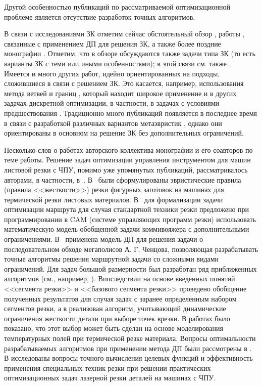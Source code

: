 \documentclass[11pt,twoside,openany]{report}
\begin{document}
Другой особенностью публикаций
по рассматриваемой оптимизационной проблеме
является отсутствие разработок точных алгоритмов.

В связи с исследованиями ЗК отметим сейчас обстоятельный обзор
\cite{intro15,intro16,intro17},
работы \cite{Cha4`,Cha16`},
связанные с применением ДП для решения ЗК,
а также более поздние монографии \cite{intro20,intro21}.
Отметим, что в обзоре
\cite{intro15,intro16,intro17}
обсуждаются также задачи типа ЗК
(то есть варианты ЗК с теми или иными особенностями);
в этой связи см. также \cite{intro22}.
Имеется и много других работ, идейно ориентированных на подходы,
сложившиеся в связи с решением ЗК.
Это касается, например,
использования метода ветвей и границ
\cite{Cha17`},
который находит широкое применение и в других задачах дискретной оптимизации,
в частности, в задачах с условиями предшествования
\cite{intro24}.
Традиционно много публикаций
появляется в последнее время в связи с разработкой
различных вариантов метаэвристик \cite{intro25,intro26,intro27,intro28},
однако они ориентированы в основном
на решение ЗК без дополнительных ограничений.

Несколько слов о работах авторского коллектива монографии
и его соавторов по теме работы.
Решение задач оптимизации управления
инструментом для машин листовой резки с ЧПУ,
помимо уже упомянутых публикаций,
рассматривалось авторами, в частности,
в~\cite{intro29,intro30,intro31,intro32,Cha15`,intro35,intro36,intro37}.
В~\cite{intro29,intro30}
были сформулированы эвристические правила
(правила <<жесткости>>) резки фигурных заготовок
на машинах для термической резки листовых материалов.
В~\cite{intro31}
для формализации задачи оптимизации маршрута
для случая стандартной техники резки
предложено при программировании в CAM
(системе
управляющих программ резки)
использовать
математическую модель обобщенной задачи коммивояжера
с дополнительными ограничениями.
В~\cite{intro32} применена модель ДП
для решения задачи о последовательном
обходе мегаполисов А. Г. Ченцова,
позволяющая разрабатывать точные алгоритмы
решения маршрутной задачи со сложными видами ограничений.
Для задач большой размерности
был разработан ряд приближенных алгоритмов
(см., например, \cite{Cha15`,intro34}).
Впоследствии на основе введенных понятий <<сегмента резки>>
и <<базового сегмента резки>> \cite{intro35,intro36}
проведено обобщение полученных результатов
для случая задач с заранее определенным набором сегментов резки,
а в \cite{intro37} реализован алгоритм,
учитывающий динамические ограничения жесткости
детали при выборе точек врезки.
В работах \cite{intro38,intro39}
было показано, что этот выбор
может быть сделан на основе моделирования температурных полей
при термической резке материала.
Вопросы оптимальности разрабатываемых алгоритмов
при применении метода ДП были рассмотрены в
\cite{intro40,intro41,intro42,intro43}.
В \cite{intro44,intro45,intro46,intro47}
исследованы вопросы точного вычисления
целевых функций и эффективность применения
специальных техник резки при решении
практических оптимизационных задач
лазерной резки деталей на машинах с ЧПУ.
\end{document}
